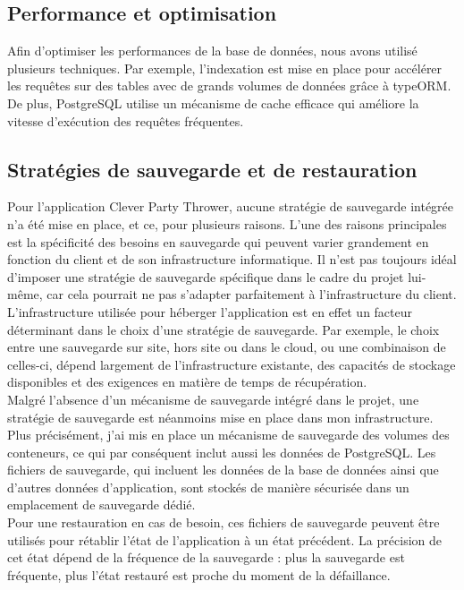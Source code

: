 \subsection{Performance et optimisation}\label{subsec:performance-optimization}
Afin d'optimiser les performances de la base de données, nous avons utilisé plusieurs techniques.
Par exemple, l'indexation est mise en place pour accélérer les requêtes sur des tables avec de grands volumes de données grâce à typeORM\@.
De plus, PostgreSQL utilise un mécanisme de cache efficace qui améliore la vitesse d'exécution des requêtes fréquentes.\\

\subsection{Stratégies de sauvegarde et de restauration}\label{subsec:backup-restore}
Pour l'application Clever Party Thrower, aucune stratégie de sauvegarde intégrée n'a été mise en place, et ce, pour plusieurs raisons.
L'une des raisons principales est la spécificité des besoins en sauvegarde qui peuvent varier grandement en fonction du client et de son infrastructure informatique.
Il n'est pas toujours idéal d'imposer une stratégie de sauvegarde spécifique dans le cadre du projet lui-même, car cela pourrait ne pas s'adapter parfaitement à l'infrastructure du client.\\

L'infrastructure utilisée pour héberger l'application est en effet un facteur déterminant dans le choix d'une stratégie de sauvegarde.
Par exemple, le choix entre une sauvegarde sur site, hors site ou dans le cloud, ou une combinaison de celles-ci, dépend largement de l'infrastructure existante,
des capacités de stockage disponibles et des exigences en matière de temps de récupération.\\

Malgré l'absence d'un mécanisme de sauvegarde intégré dans le projet, une stratégie de sauvegarde est néanmoins mise en place dans mon infrastructure.
Plus précisément, j'ai mis en place un mécanisme de sauvegarde des volumes des conteneurs, ce qui par conséquent inclut aussi les données de PostgreSQL.
Les fichiers de sauvegarde, qui incluent les données de la base de données ainsi que d'autres données d'application, sont stockés de manière sécurisée dans un emplacement de sauvegarde dédié.\\

Pour une restauration en cas de besoin, ces fichiers de sauvegarde peuvent être utilisés pour rétablir l'état de l'application à un état précédent.
La précision de cet état dépend de la fréquence de la sauvegarde : plus la sauvegarde est fréquente, plus l'état restauré est proche du moment de la défaillance.\\

